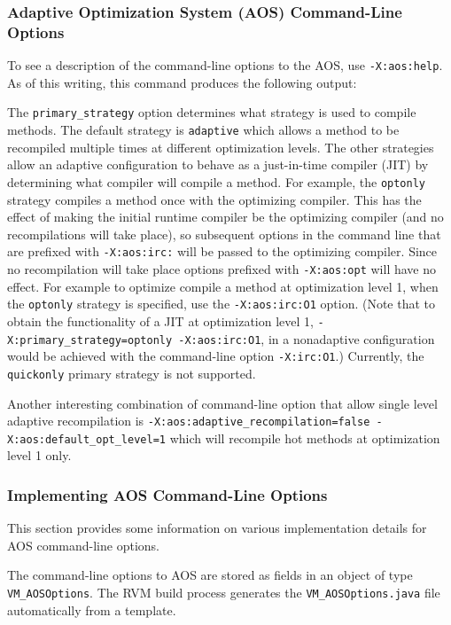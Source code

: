 \subsubsection{Adaptive Optimization System (AOS) Command-Line Options}

To see a description of the command-line options to the
AOS, use {\tt -X:aos:help}.
As of this writing, this command produces the following output:



The {\tt primary\_strategy} option determines what strategy is used to compile
methods.
The default strategy is {\tt adaptive} which allows a method to be
recompiled multiple times at different optimization levels.
The other strategies allow an adaptive configuration to behave as a
just-in-time compiler (JIT) by determining what compiler will compile a method.
For example, the {\tt optonly} strategy compiles a method once with the 
optimizing compiler. This has the effect of making the initial runtime compiler
be the optimizing compiler (and no recompilations will take place), so 
subsequent options in the command line that are prefixed with {\tt -X:aos:irc:}
will be passed to the optimizing compiler. Since no recompilation will take
place options prefixed with {\tt -X:aos:opt} will have no effect.
For example to optimize compile a method at optimization level 1,
when the {\tt optonly} strategy is specified, use the {\tt -X:aos:irc:O1} option.
(Note that to obtain the functionality of a JIT at optimization level 1, 
{\tt -X:primary\_strategy=optonly -X:aos:irc:O1}, in a nonadaptive configuration
would be achieved with the command-line option {\tt -X:irc:O1}.)
Currently, the {\tt quickonly} primary strategy is not supported.


Another interesting combination of command-line option that allow single level
adaptive recompilation is 
{\tt -X:aos:adaptive\_recompilation=false -X:aos:default\_opt\_level=1} 
which will recompile hot methods at optimization level 1 only.

\subsubsection{Implementing AOS Command-Line Options}

This section provides some information on various
implementation details for AOS command-line options.

The command-line options to AOS are
stored as fields in an object of type {\tt VM\_AOSOptions}.
The RVM build process generates the {\tt VM\_AOSOptions.java} 
file automatically from a template.  

